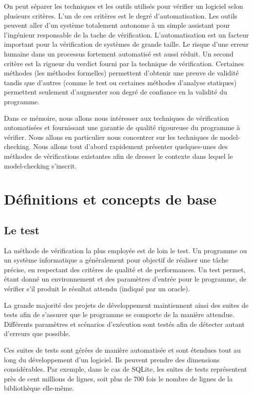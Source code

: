 On peut séparer les techniques et les outils utilisés pour vérifier un
logiciel selon plusieurs critères. L'un de ces critères est le degré
d'automatisation. Les outils peuvent aller d'un système totalement
autonome à un simple assistant pour l'ingénieur responsable de la tache de
vérification. L'automatisation est un facteur important pour la
vérification de systèmes de grande taille. Le risque d'une erreur
humaine dans un processus fortement automatisé est aussi réduit. Un
second critère est la rigueur du verdict fourni par la technique de
vérification. Certaines méthodes (les méthodes formelles) permettent
d'obtenir une preuve de validité tandis que d'autres (comme le test ou
certaines méthodes d'analyse statiques) permettent seulement d'augmenter
son degré de confiance en la validité du programme.

Dans ce mémoire, nous allons nous intéresser aux techniques de
vérification automatisées et fournissant une garantie de qualité
rigoureuse du programme à vérifier. Nous allons en particulier nous
concentrer sur les techniques de model-checking. Nous allons tout
d'abord rapidement présenter quelques-unes des méthodes de vérifications
existantes afin de dresser le contexte dans lequel le model-checking
s'inscrit.

\section{Définitions et concepts de base}  %

\subsection{Le test}

La méthode de vérification la plus employée est de loin le test. Un
programme ou un système informatique a généralement pour objectif de
réaliser une tâche précise, en respectant des critères de qualité et de
performances. Un test permet, étant donné un environnement et des
paramètres d'entrée pour le programme, de vérifier s’il produit le
résultat attendu (indiqué par un oracle).

La grande majorité des projets de développement maintiennent ainsi des
suites de tests afin de s'assurer que le programme se comporte de la
manière attendue. Différents paramètres et scénarios d'exécution sont
testés afin de détecter autant d'erreurs que possible.

Ces suites de tests sont gérées de manière automatisée et sont étendues
tout au long du développement d'un logiciel. Ils peuvent prendre des
dimensions considérables. Par exemple, dans le cas de SQLite, les
suites de tests représentent près de cent millions de lignes, soit plus
de 700 fois le nombre de lignes de la bibliothèque elle-même\cite{SQLite_test}.

